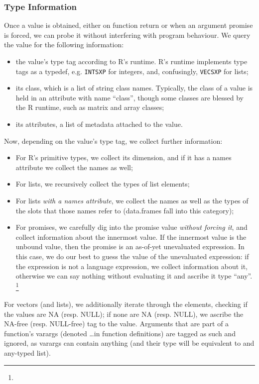 \documentclass[acmsmall,review,anonymous]{acmart}\settopmatter{printfolios=true,printccs=false,printacmref=false}
\newcommand{\code}[1]{{\lstinline[style=Rin]!#1!}\xspace}
\begin{document}
\subsubsection{Type Information}
Once a value is obtained, either on function return or when an argument
promise is forced, we can probe it without interfering with program behaviour.
We query the value for the following information:

\begin{itemize}
\item the value's type tag according to R's runtime. R's runtime implements
  type tags as a typedef, e.g. \code{INTSXP} for integers, and, confusingly,
  \code{VECSXP} for lists;
\item its class, which is a list of string class names. Typically, the class
  of a value is held in an attribute with name ``class'', though some
  classes are blessed by the R runtime, such as matrix and array classes;
\item its attributes, a list of metadata attached to the value.
\end{itemize}

Now, depending on the value's type tag, we collect further information:

\begin{itemize}
\item For R's primitive types, we collect its dimension, and if it has a
  names attribute we collect the names as well;
\item For lists, we recursively collect the types of list elements;
\item For lists {\it with a names attribute}, we collect the names as well
  as the types of the slots that those names refer to (data.frames fall into
  this category);
\item For promises, we carefully dig into the promise value {\it without
  forcing it}, and collect information about the innermost value. If the
  innermost value is the unbound value, then the promise is an as-of-yet
  unevaluated expression. In this case, we do our best to guess the value of
  the unevaluated expression: if the expression is not a language
  expression, we collect information about it, otherwise we can say nothing
  without evaluating it and ascribe it type ``any''. \footnote{}
\end{itemize}

For vectors (and lists), we additionally iterate through the elements,
checking if the values are NA (resp. NULL); if none are NA (resp. NULL), we
ascribe the NA-free (resp. NULL-free) tag to the value.  Arguments that are
part of a function's varargs (denoted \ldots in function definitions) are
tagged as such and ignored, as varargs can contain anything (and their type
will be equivalent to and any-typed list).
\end{document}
